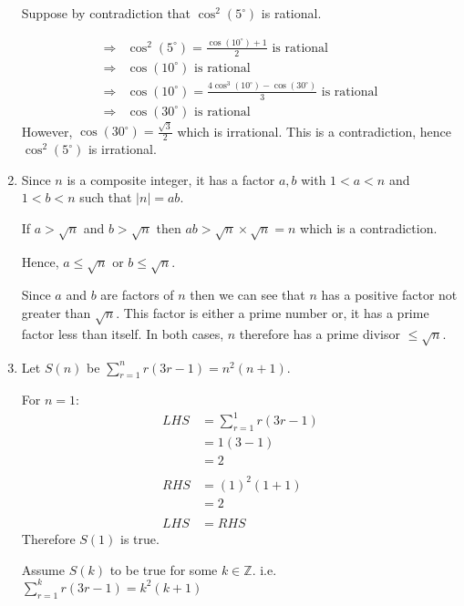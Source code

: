 \documentclass[11pt, a4paper, oneside]{exam}
\theoremstyle{definition}\newtheorem{define}{Definition}[section]
\theoremstyle{remark}\newtheorem{remark}{Remark}
\theoremstyle{definition}\newtheorem{example}{Example}[subsection]
\theoremstyle{definition}\newtheorem{notation}{Notation}[section]
\theoremstyle{definition}\newtheorem{theorem}{Theorem}[section]
\theoremstyle{definition}\newtheorem{corollary}{Corollary}[section]
\begin{document}
\begin{enumerate}
Suppose by contradiction that $\cos^2(5^\circ)$ is rational.

\begin{align*}
\Rightarrow & \cos^2(5^\circ) = \frac{\cos (10^\circ) + 1}{2} \mbox{ is rational }\\
\Rightarrow & \cos (10^\circ) \mbox{ is rational }\\
\Rightarrow & \cos (10^\circ) = \frac{4\cos^3 (10^\circ) - \cos (30^\circ)}{3}\mbox{ is rational}\\
\Rightarrow & \cos(30^\circ) \mbox{ is rational}
\end{align*}
However, $\cos(30^\circ) =\frac{\sqrt{3}}{2}$ which is irrational. This is a contradiction, hence $\cos^2(5^\circ)$ is irrational.

\item

Since $n$ is a composite integer, it has a factor $a,b$ with $1<a<n$ and $1<b<n$ such that $|n| = ab$.

If $a > \sqrt{n}$ and $b > \sqrt{n}$ then $ab > \sqrt{n} \times \sqrt{n} = n$ which is a contradiction.

Hence, $a \leq \sqrt{n}$ or $b \leq \sqrt{n}$.

Since $a$ and $b$ are factors of $n$ then we can see that $n$ has a positive factor not greater than $\sqrt{n}$. This factor is either a prime number or, it has a prime factor less than itself. In both cases, $n$ therefore has a prime divisor $\leq \sqrt{n}$.








\item %


Let $S(n)$ be $ \sum_{r=1}^n r(3r-1) = n^2(n+1)$.

For $n=1$:
\begin{align*}
LHS & =  \sum_{r=1}^1 r(3r-1)\\
& = 1(3-1)\\
& = 2\\
\\
RHS & = (1)^2(1+1)\\
& = 2\\
\\
LHS & = RHS
\end{align*}
Therefore $S(1)$ is true.

Assume $S(k)$ to be true for some $k \in \mathbb{Z}$. i.e. $ \sum_{r=1}^k r(3r-1) = k^2(k+1)$


\end{enumerate}
\end{document}
